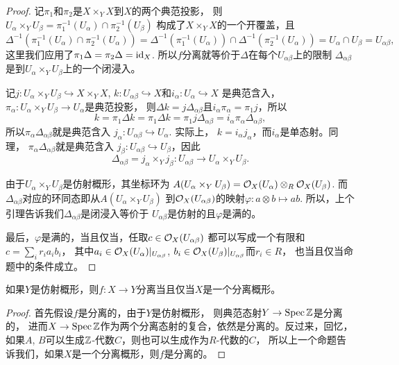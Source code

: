 \begin{proof}
记$\pi_1$和$\pi_2$是$X\times_Y X$到$X$的两个典范投影，
则$U_\alpha\times_Y U_\beta=\pi_1^{-1}(U_\alpha)\cap\pi_2^{-1}(U_\beta)$
构成了$X\times_Y X$的一个开覆盖，且
\[
	\Delta^{-1}\left(\pi_1^{-1}(U_\alpha)\cap\pi_2^{-1}(U_\alpha)\right)=
	\Delta^{-1}\left(\pi_1^{-1}(U_\alpha)\right)\cap\Delta^{-1}
	\left(\pi_2^{-1}(U_\alpha)\right)=U_\alpha\cap U_\beta=U_{\alpha\beta},
\]
这里我们应用了$\pi_1\Delta=\pi_2\Delta=\operatorname{id}_X$. 
所以$f$分离就等价于$\Delta$在每个$U_{\alpha\beta}$上的限制
$\Delta_{\alpha\beta}$是到$U_\alpha\times_Y U_\beta$上的一个闭浸入。

记$j:U_\alpha\times_Y U_\beta\hookrightarrow X \times_Y X$, 
$k:U_{\alpha\beta}\hookrightarrow X$和$i_\alpha:U_\alpha\hookrightarrow X$
是典范含入，$\pi_\alpha:U_\alpha\times_Y U_\beta\to U_\alpha$是典范投影，
则$\Delta k=j\Delta_{\alpha\beta}$且$i_\alpha\pi_\alpha=\pi_1j$，所以
\[
	k=\pi_1\Delta k=\pi_1\Delta k=\pi_1j\Delta_{\alpha\beta}=
	i_\alpha\pi_\alpha\Delta_{\alpha\beta},
\]
所以$\pi_\alpha\Delta_{\alpha\beta}$就是典范含入
$j_\alpha:U_{\alpha\beta}\hookrightarrow U_\alpha$. 实际上，
$k=i_\alpha j_\alpha$，而$i_\alpha$是单态射。同理，
$\pi_\alpha\Delta_{\alpha\beta}$就是典范含入
$j_\beta:U_{\alpha\beta}\hookrightarrow U_\beta$，因此
\[
	\Delta_{\alpha\beta}=j_\alpha\times_Y j_\beta:
	U_{\alpha\beta}\to U_\alpha\times_Y U_\beta.
\]

由于$U_\alpha\times_Y U_\beta$是仿射概形，其坐标环为
$A(U_\alpha\times_Y U_\beta)=\mathcal{O}_X(U_\alpha)\otimes_{R}\mathcal{O}_X(U_\beta)$.
而$\Delta_{\alpha\beta}$对应的环同态即从$A(U_\alpha\times_Y U_\beta)$
到$\mathcal{O}_X(U_{\alpha\beta})$的映射$\varphi:a\otimes b\mapsto ab$. 
所以，上个引理告诉我们$\Delta_{\alpha\beta}$是闭浸入等价于
$U_{\alpha\beta}$是仿射的且$\varphi$是满的。

最后，$\varphi$是满的，当且仅当，任取$c\in \mathcal{O}_X(U_{\alpha\beta})$
都可以写成一个有限和$c=\sum_{i}r_ia_ib_i$，
其中$a_i\in \mathcal{O}_X(U_\alpha)|_{U_{\alpha\beta}}$, 
$b_i\in \mathcal{O}_X(U_\beta)|_{U_{\alpha\beta}}$而$r_i\in R$，
也当且仅当命题中的条件成立。
\end{proof}

\begin{coro}
如果$Y$是仿射概形，则$f:X\to Y$分离当且仅当$X$是一个分离概形。
\end{coro}

\begin{proof}
首先假设$f$是分离的，由于$Y$是仿射概形，
则典范态射$Y\to \operatorname{Spec} \mathbb{Z}$是分离的，
进而$X\to\operatorname{Spec} \mathbb{Z}$作为两个分离态射的复合，依然是分离的。反过来，回忆，
如果$A$, $B$可以生成$\mathbb{Z}$-代数$C$，则也可以生成作为$R$-代数的$C$，
所以上一个命题告诉我们，如果$X$是一个分离概形，则$f$是分离的。
\end{proof}

